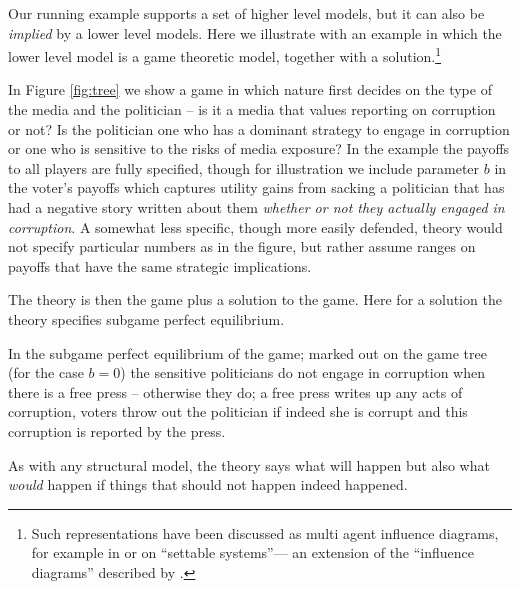 \documentclass[
  12pt,
]{book}
\begin{document}
Our running example supports a set of higher level models, but it can also be \emph{implied} by a lower level models. Here we illustrate with an example in which the lower level model is a game theoretic model, together with a solution.\footnote{Such representations have been discussed as multi agent influence diagrams, for example in \citet{koller2003multi} or \citet{white2009settable} on ``settable systems''--- an extension of the ``influence diagrams'' described by \citet{dawid2002influence}.}

In Figure \ref{fig:tree} we show a game in which nature first decides on the type of the media and the politician -- is it a media that values reporting on corruption or not? Is the politician one who has a dominant strategy to engage in corruption or one who is sensitive to the risks of media exposure? In the example the payoffs to all players are fully specified, though for illustration we include parameter \(b\) in the voter's payoffs which captures utility gains from sacking a politician that has had a negative story written about them \emph{whether or not they actually engaged in corruption}. A somewhat less specific, though more easily defended, theory would not specify particular numbers as in the figure, but rather assume ranges on payoffs that have the same strategic implications.

The theory is then the game plus a solution to the game. Here for a solution the theory specifies subgame perfect equilibrium.

In the subgame perfect equilibrium of the game; marked out on the game tree (for the case \(b=0\)) the sensitive politicians do not engage in corruption when there is a free press -- otherwise they do; a free press writes up any acts of corruption, voters throw out the politician if indeed she is corrupt and this corruption is reported by the press.

As with any structural model, the theory says what will happen but also what \emph{would} happen if things that should not happen indeed happened.
\end{document}
